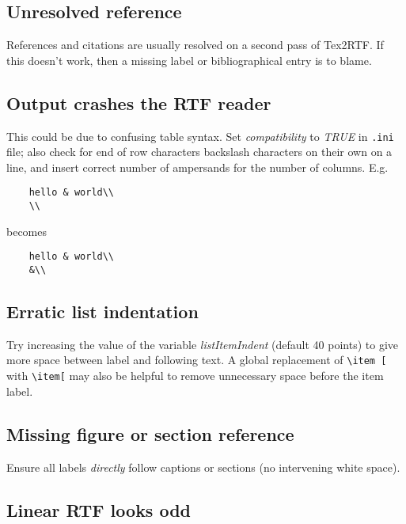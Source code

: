 \subsection{Unresolved reference}%

References and citations are usually resolved on a second pass of
Tex2RTF. If this doesn't work, then a missing label or bibliographical
entry is to blame.

\subsection{Output crashes the RTF reader}

This could be due to confusing table syntax. Set {\it compatibility} to\rtfsp
{\it TRUE} in {\tt .ini} file; also check for end of row characters backslash characters
on their own on a line, and insert correct number of ampersands for the number of
columns.  E.g.

\begin{verbatim}
    hello & world\\
    \\
\end{verbatim}

becomes

\begin{verbatim}
    hello & world\\
    &\\
\end{verbatim}

\subsection{Erratic list indentation}

Try increasing the value of the variable {\it listItemIndent} (default 40
points) to give more space between label and following text. A global
replacement of \verb$\item [$ with \verb$\item[$ may also be helpful to remove
unnecessary space before the item label.

\subsection{Missing figure or section reference}

Ensure all labels {\it directly} follow captions or sections (no intervening
white space).

\subsection{Linear RTF looks odd}

